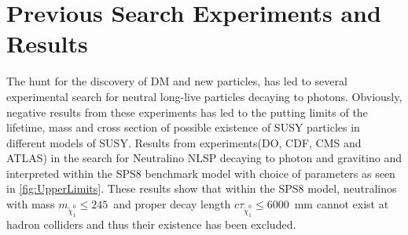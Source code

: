 {%
\section{Previous Search Experiments and Results}
The hunt for the discovery of DM and new particles, has led to several experimental search  for neutral long-live particles decaying to photons. Obviously, negative results from these experiments has led to the putting limits of the lifetime, mass and cross section of possible existence of SUSY particles in different models of SUSY. Results from experiments(DO, CDF, CMS and ATLAS)\cite{LEP,CDF,ATLAS, CMSD, ATLAS1} in the search for Neutralino NLSP decaying to photon and gravitino  and interpreted within the SPS8 benchmark model with choice of parameters as seen in \ref{fig:UpperLimits}. These results show that within the SPS8 model, neutralinos with mass $m_{\tilde{\chi}^{0}_{1}} \leq 245$~\GeV and proper decay length $c\tau_{\tilde{\chi}^{0}_{1}} \leq 6000$~mm cannot exist at hadron colliders and thus their existence has been excluded.

}
